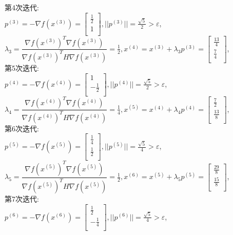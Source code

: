 \begin{solution}
    第4次迭代:\\
    $p^{(3)}=-\nabla f(x^{(3)})=\begin{bmatrix} \frac{1}{2}\\1\\\end{bmatrix},||p^{(3)}||=\frac{\sqrt{5}}{2}>\varepsilon$,\\
    $\lambda_3=\dfrac{\nabla f(x^{(3)})^T\nabla f(x^{(3)})}{\nabla f(x^{(3)})^TH\nabla f(x^{(3)})}=\frac{1}{2},x^{(4)}=x^{(3)}+\lambda_3p^{(3)}=\begin{bmatrix} \frac{13}{4}\\\frac{7}{4}\\\end{bmatrix}$,\\
    第5次迭代:\\
    $p^{(4)}=-\nabla f(x^{(4)})=\begin{bmatrix} 1\\-\frac{1}{2}\\\end{bmatrix},||p^{(4)}||=\frac{\sqrt{5}}{2}>\varepsilon$,\\
    $\lambda_4=\dfrac{\nabla f(x^{(4)})^T\nabla f(x^{(4)})}{\nabla f(x^{(4)})^TH\nabla f(x^{(4)})}=\frac{1}{4},x^{(5)}=x^{(4)}+\lambda_4p^{(4)}=\begin{bmatrix} \frac{7}{2}\\\frac{13}{8}\\\end{bmatrix}$,\\
    第6次迭代:\\
    $p^{(5)}=-\nabla f(x^{(5)})=\begin{bmatrix} \frac{1}{4}\\\frac{1}{2}\\\end{bmatrix},||p^{(5)}||=\frac{\sqrt{5}}{4}>\varepsilon$,\\
    $\lambda_5=\dfrac{\nabla f(x^{(5)})^T\nabla f(x^{(5)})}{\nabla f(x^{(5)})^TH\nabla f(x^{(5)})}=\frac{1}{2},x^{(6)}=x^{(5)}+\lambda_5p^{(5)}=\begin{bmatrix} \frac{29}{8}\\\frac{15}{8}\\\end{bmatrix}$,\\
    第7次迭代:\\
    $p^{(6)}=-\nabla f(x^{(6)})=\begin{bmatrix} \frac{1}{2}\\-\frac{1}{4}\\\end{bmatrix},||p^{(6)}||=\frac{\sqrt{5}}{4}>\varepsilon$,\\

\end{solution}
